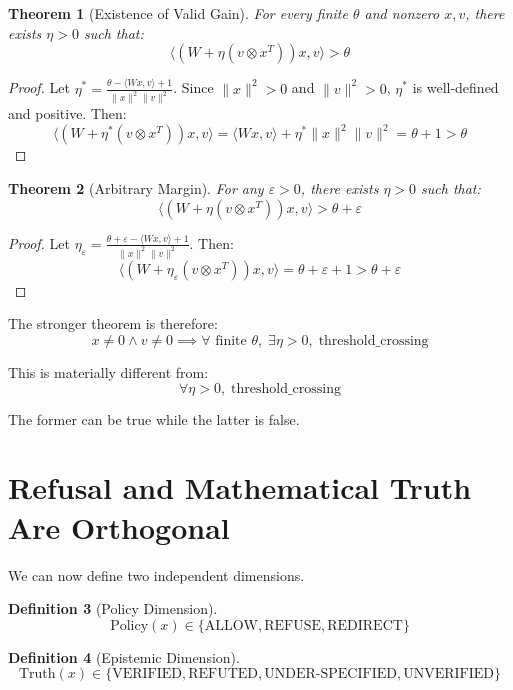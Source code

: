 \documentclass[11pt,a4paper]{article}
\newtheorem{theorem}{Theorem}
\newtheorem{definition}[theorem]{Definition}
\begin{document}
\begin{theorem}[Existence of Valid Gain]
\label{thr:existence}
For every finite $\theta$ and nonzero $x, v$, there exists $\eta > 0$ such that:
\[
\langle (W + \eta(v \otimes x^T))x, v \rangle > \theta
\]
\end{theorem}

\begin{proof}
Let $\eta^* = \frac{\theta - \langle Wx, v \rangle + 1}{\|x\|^2 \|v\|^2}$. Since $\|x\|^2 > 0$ and $\|v\|^2 > 0$, $\eta^*$ is well-defined and positive. Then:
\[
\langle (W + \eta^*(v \otimes x^T))x, v \rangle = \langle Wx, v \rangle + \eta^* \|x\|^2 \|v\|^2 = \theta + 1 > \theta
\]
\end{proof}

\begin{theorem}[Arbitrary Margin]
\label{thr:margin}
For any $\varepsilon > 0$, there exists $\eta > 0$ such that:
\[
\langle (W + \eta(v \otimes x^T))x, v \rangle > \theta + \varepsilon
\]
\end{theorem}

\begin{proof}
Let $\eta_\varepsilon = \frac{\theta + \varepsilon - \langle Wx, v \rangle + 1}{\|x\|^2 \|v\|^2}$. Then:
\[
\langle (W + \eta_\varepsilon(v \otimes x^T))x, v \rangle = \theta + \varepsilon + 1 > \theta + \varepsilon
\]
\end{proof}

The stronger theorem is therefore:
\[
x \neq 0 \wedge v \neq 0 \implies \forall \text{ finite } \theta, \; \exists \eta > 0, \; \text{threshold\_crossing}
\]

This is materially different from:
\[
\forall \eta > 0, \; \text{threshold\_crossing}
\]

The former can be true while the latter is false.

\section{Refusal and Mathematical Truth Are Orthogonal}

We can now define two independent dimensions.

\begin{definition}[Policy Dimension]
\[
\text{Policy}(x) \in \{\text{ALLOW}, \text{REFUSE}, \text{REDIRECT}\}
\]
\end{definition}

\begin{definition}[Epistemic Dimension]
\[
\text{Truth}(x) \in \{\text{VERIFIED}, \text{REFUTED}, \text{UNDER-SPECIFIED}, \text{UNVERIFIED}\}
\]
\end{definition}
\end{document}
